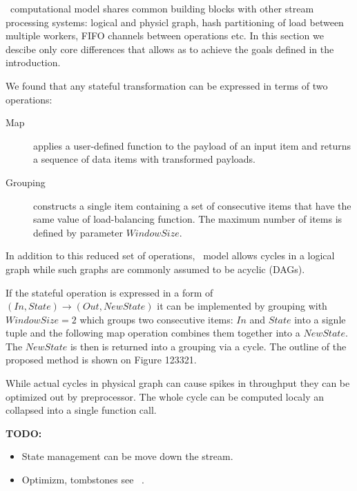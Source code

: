 \label {fs-short-model}

\FlameStream\ computational model shares common building blocks with other stream processing systems: logical and physicl graph, hash partitioning of load between multiple workers, FIFO channels between operations etc. In this section we descibe only core differences that allows as to achieve the goals defined in the introduction.

We found that any stateful transformation can be expressed in terms of two operations:

\begin {description}
  \item [Map] applies a user-defined function to the payload of an input item and returns a sequence of data items with transformed payloads. 
  \item [Grouping] constructs a single item containing a set of consecutive items that have the same value of load-balancing function. The maximum number of items is defined by parameter $Window Size$. 
\end {description}

In addition to this reduced set of operations, \FlameStream\ model allows cycles in a logical graph while such graphs are commonly assumed to be acyclic (DAGs).

If the stateful operation is expressed in a form of $(In, State) \rightarrow (Out, NewState)$ it can be implemented by grouping with $WindowSize = 2$ which groups two consecutive items: $In$ and $State$ into a signle tuple and the following map operation combines them together into a $NewState$. The $NewState$ is then is returned into a grouping via a cycle. The outline of the proposed method is shown on Figure 123321.

While actual cycles in physical graph can cause spikes in throughput they can be optimized out by preprocessor. The whole cycle can be computed localy an collapsed into a single function call.

{\bf TODO:}

\begin{itemize}
  \item State management can be move down the stream.
  \item Optimizm, tombstones see ~\cite{we2018seim}.
\end{itemize}
